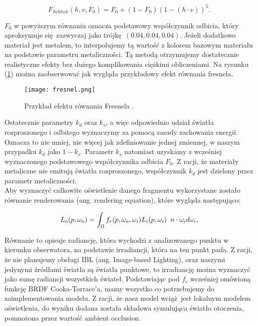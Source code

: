 \[
	F_{Schlick}(h, v, F_0) = F_0 + (1-F_0)(1-(h\cdot v))^5.
\]

$F_0$ w powyższym równaniu oznacza podstawowy współczynnik odbicia, który aproksymuje się zazwyczaj jako trójkę $(0.04,0.04,0.04)$. Jeżeli dodatkowo materiał jest metalem, to interpolujemy tą wartość z kolorem bazowym materiału na podstawie parametru metaliczności. Tą metodą otrzymujemy dostatecznie realistyczne efekty bez dużego komplikowania ciężkimi obliczeniami. Na rysunku (\ref{fresnel}) można zaobserwować jak wygląda przykładowy efekt równania fresnela.
\\

\begin{figure}[h]
	\centering
	\texttt{[image: fresnel.png]}
	\caption{Przykład efektu równania Fresnela \cite{learnopengl}.}
	\label{fresnel}
\end{figure}

Ostatecznie parametry $k_d$ oraz $k_s$, a więc odpowiednio udział światła rozproszonego i odbitego wyznaczymy za pomocą zasady zachowania energii. Oznacza to nie mniej, nie więcej jak zdefiniowanie jednej zmiennej, w naszym przypadku $k_d$ jako $1 - k_s$. Parametr $k_s$ natomiast uzyskamy z wcześniej wyznaczonego podstawowego współczynnika odbicia $F_0$. Z racji, że materiały metaliczne nie emitują światła rozproszonego, współczynnik $k_d$ jest dzielony przez parametr metaliczności.
\\

Aby wyznaczyć całkowite oświetlenie danego fragmentu wykorzystane zostało równanie renderowania (ang. rendering equation), które wygląda następująco:

$$
L_o(p, \omega_o) = \int_\Omega f_r(p, \omega_o, \omega_i)L_i(p, \omega_i) \hspace{0.5em} n \cdot \omega_i d\omega_i,
$$ 

Równanie to opisuje radiancję, która wychodzi z analizowanego punktu w kierunku obserwatora, na podstawie irradiancji, która na ten punkt pada. Z racji, że nie planujemy obsługi IBL (ang. Image-based Lighting), oraz naszymi jedynymi źródłami światła są światła punktowe, to irradiancję można wyznaczyć jako sumę radiancji wszystkich świateł. Podstawiając pod $f_r$ wcześniej omówioną funkcję BRDF Cooka-Torrace'a, mamy wszystko co potrzebujemy do zaimplementowania modelu. Z racji, że nasz model wciąż jest lokalnym modelem oświetlenia, do wyniku dodana została składowa symulująca światło otoczenia, pomnożona przez wartość ambient occlusion.
\\

